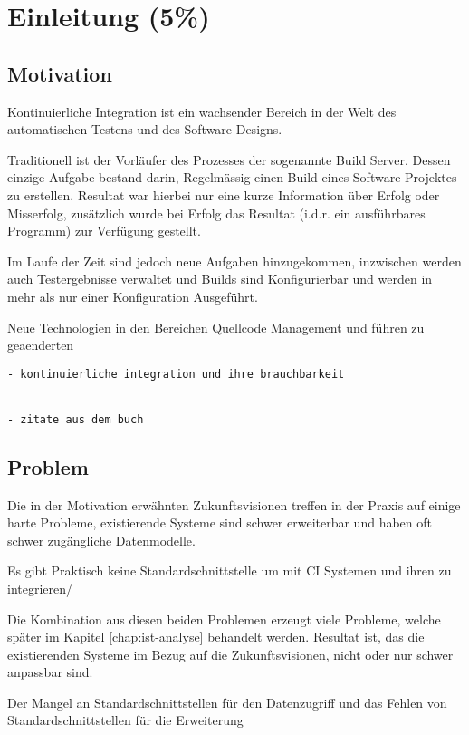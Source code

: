 \chapter{Einleitung (5\%) }

\section{Motivation}


Kontinuierliche Integration ist ein wachsender Bereich in der Welt
des automatischen Testens und des Software-Designs.

Traditionell ist der Vorläufer des Prozesses der sogenannte Build Server.
Dessen einzige Aufgabe bestand darin,
Regelmässig einen Build eines Software-Projektes zu erstellen.
Resultat war hierbei nur eine kurze Information über Erfolg oder Misserfolg,
zusätzlich wurde bei Erfolg das Resultat (i.d.r. ein ausführbares Programm)
zur Verfügung gestellt.

Im Laufe der Zeit sind jedoch neue Aufgaben hinzugekommen,
inzwischen werden auch Testergebnisse verwaltet und Builds sind Konfigurierbar
und werden in mehr als nur einer Konfiguration Ausgeführt.

Neue Technologien in den Bereichen Quellcode Management und führen zu geaenderten



\begin{verbatim}
- kontinuierliche integration und ihre brauchbarkeit


- zitate aus dem buch

\end{verbatim}

\section{Problem}

Die in der Motivation erwähnten Zukunftsvisionen treffen in der Praxis auf einige harte Probleme,
existierende Systeme sind schwer erweiterbar und haben oft schwer zugängliche Datenmodelle.

Es gibt Praktisch keine Standardschnittstelle um mit CI Systemen und ihren zu integrieren/

Die Kombination aus diesen beiden Problemen erzeugt viele Probleme,
welche später im Kapitel \ref{chap:ist-analyse} behandelt werden.
Resultat ist, das die existierenden Systeme im Bezug auf die Zukunftsvisionen,
nicht oder nur schwer anpassbar sind.

Der Mangel an Standardschnittstellen für den Datenzugriff und
das Fehlen von Standardschnittstellen für die Erweiterung 





